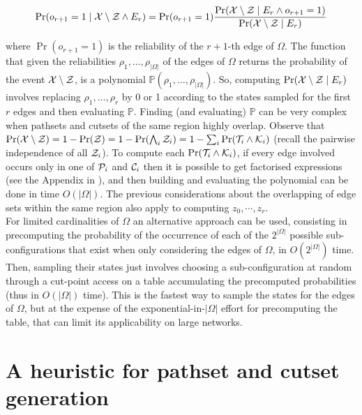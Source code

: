\documentclass[a4paper]{article}
\begin{document}
\begin{equation*}
\Pr(o_{r+1}= 1 \mid {\cal X}\setminus{\cal Z} \wedge E_r) =
	\Pr(o_{r+1}=1) \frac {\Pr({\cal X}\setminus{\cal Z} \mid  E_r\wedge o_{r+1}=1)} {\Pr({\cal X}\setminus{\cal Z} \mid E_r)}
\end{equation*}

where $\Pr(o_{r+1}=1)$ is the reliability of the $r+1$-th edge of $\Omega$. The function that given the reliabilities $\rho_1,\dots,\rho_{|\Omega|}$ of the edges of $\Omega$ returns the probability of the event ${\cal X}\setminus {\cal Z}$, is a polynomial ${\mathbb P}(\rho_1,\dots,\rho_{|\Omega|})$. So, computing $\Pr({\cal X}\setminus{\cal Z} \mid E_r)$ involves replacing $\rho_1,\dots,\rho_r$ by 0 or 1 according to the states sampled for the first $r$ edges and then evaluating $\mathbb P$. Finding (and evaluating) $\mathbb P$ can be very complex when pathsets and cutsets of the same region highly overlap. Observe that $\Pr({\cal X}\setminus {\cal Z})=1-\Pr({\cal Z})= 1-\Pr(\bigwedge_i{\cal Z}_i)=1-\sum_i\Pr({\cal T}_i\wedge {\cal K}_i)$ (recall the pairwise independence of all ${\cal Z}_i$). To compute each $\Pr({\cal T}_i\wedge {\cal K}_i)$, if every edge involved occurs only in one of ${\cal P}_i$ and ${\cal C}_i$ then it is possible to get factorised expressions (see the Appendix in \cite{SartorCOMCOM2012}), and then building and evaluating the polynomial can be done in time $O(|\Omega|)$. The previous considerations about the overlapping of edge sets within the same region also apply to computing $z_0,\cdots,z_r$. \\

For limited cardinalities of $\Omega$ an alternative approach can be used, consisting in precomputing the probability of the occurrence of each of the $2^{|\Omega|}$ possible sub-configurations that exist when only considering the edges of $\Omega$, in $O(2^{|\Omega|})$ time. Then, sampling their states just involves choosing a sub-configuration at random through a cut-point access on a table accumulating the precomputed probabilities (thus in $O(|\Omega|)$ time). This is the fastest way to sample the states for the edges of $\Omega$, but at the expense of the exponential-in-$|\Omega|$ effort for precomputing the table, that can limit its applicability on large networks.








\section{A heuristic for pathset and cutset generation}\label{s:heurisPatCut}
\end{document}

